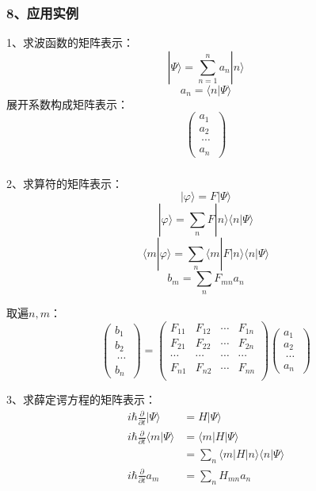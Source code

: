 \begin{frame} 
    \frametitle{8、应用实例}  
    1、求波函数的矩阵表示：  
    $$|\Psi \rangle =\sum\limits_{n=1} ^n a_n |n \rangle$$
    $$ a_n= \langle n | \Psi \rangle$$ 
    展开系数构成矩阵表示：  
    $$\begin{pmatrix}
    a_1\\
    a_2\\\
    \cdots\\
    a_n\
    \end{pmatrix} $$
\end{frame} 

\begin{frame} 
    \frametitle{}  
    2、求算符的矩阵表示：  
    $$|\varphi \rangle = F |\Psi \rangle$$
    $$|\varphi \rangle = \sum_n F |n\rangle\langle n |\Psi \rangle$$
    $$\langle m |\varphi \rangle = \sum_n  \langle m| F |n\rangle\langle n |\Psi \rangle$$
    $$ b_m = \sum_n  F_{mn} a_n$$

    取遍$n,m$：  
    $$\begin{pmatrix}
    b_1\\
    b_2\\\
    \cdots\\
    b_n\
    \end{pmatrix} 
    = 
    \begin{pmatrix}
        F_{11} & F_{12} & \cdots & F_{1n} \\
        F_{21} & F_{22} & \cdots & F_{2n} \\
        \cdots & \cdots &  \cdots &  \cdots \\
        F_{n1} & F_{n2} & \cdots & F_{nn} \\
    \end{pmatrix} 
    \begin{pmatrix}
        a_1\\
        a_2\\\
        \cdots\\
        a_n\
    \end{pmatrix} 
    $$
\end{frame} 

\begin{frame} 
    3、求薛定谔方程的矩阵表示： 
    $$ \begin{aligned}
    i \hbar \frac{\partial}{\partial t} |\Psi \rangle &= H |\Psi \rangle  \\
    i \hbar \frac{\partial}{\partial t} \langle m |\Psi \rangle &= \langle m |H |\Psi \rangle \\ 
     &= \sum_n \langle m |H |n\rangle\langle n |\Psi \rangle  \\
     i \hbar \frac{\partial}{\partial t} a_m  &= \sum_n H_{mn} a_n 
    \end{aligned}
    $$
\end{frame} 

